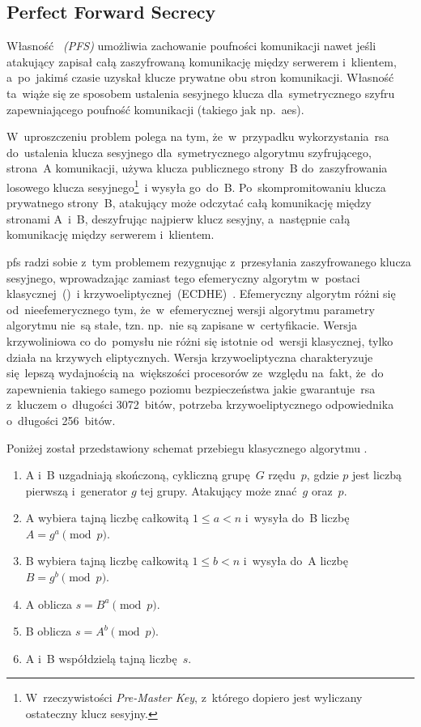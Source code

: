 \documentclass[thesis]{subfiles}
\begin{document}

\subsection{Perfect Forward Secrecy}
\label{sec:pfs}

Własność \emph{~(PFS)} umożliwia zachowanie poufności komunikacji nawet jeśli atakujący zapisał całą zaszyfrowaną komunikację między serwerem i~klientem, a~po~jakimś czasie uzyskał klucze prywatne obu stron komunikacji. Własność ta~wiąże się ze sposobem ustalenia sesyjnego klucza dla~symetrycznego szyfru zapewniającego poufność komunikacji (takiego jak np.~\gls{aes}).

W~uproszczeniu problem polega na tym, że~w~przypadku wykorzystania~\gls{rsa} do~ustalenia klucza sesyjnego dla~symetrycznego algorytmu szyfrującego, strona~A komunikacji, używa klucza publicznego strony~B do~zaszyfrowania losowego klucza sesyjnego\footnote{W~rzeczywistości \emph{Pre-Master Key}, z~którego dopiero jest wyliczany ostateczny klucz sesyjny.}~i wysyła go~do~B. Po~skompromitowaniu klucza prywatnego strony~B, atakujący może odczytać całą komunikację między stronami A~i~B, deszyfrując najpierw klucz sesyjny, a~następnie całą komunikację między serwerem i~klientem.

\gls{pfs} radzi sobie z~tym problemem rezygnując z~przesyłania zaszyfrowanego klucza sesyjnego, wprowadzając zamiast tego efemeryczny algorytm  w~postaci klasycznej~()~i krzywoeliptycznej~(ECDHE)~\cite{mimuw-ssl-w04,openssl-cookbook-suites}. Efemeryczny algorytm  różni się od~nieefemerycznego tym, że~w~efemerycznej wersji algorytmu parametry algorytmu nie~są stałe, tzn. np.~nie są zapisane w~certyfikacie. Wersja krzywoliniowa co do~pomysłu nie różni się istotnie od~wersji klasycznej, tylko działa na krzywych eliptycznych. Wersja krzywoeliptyczna charakteryzuje się~lepszą wydajnością na~większości procesorów ze~względu na~fakt, że~do zapewnienia takiego samego poziomu bezpieczeństwa jakie gwarantuje~\gls{rsa} z~kluczem o~długości 3072~bitów, potrzeba krzywoeliptycznego odpowiednika o~długości 256~bitów.

Poniżej został przedstawiony schemat przebiegu klasycznego algorytmu .

\begin{enumerate}
\item A i~B uzgadniają skończoną, cykliczną grupę~$G$ rzędu~$p$, gdzie $p$ jest liczbą pierwszą i~generator $g$ tej grupy. Atakujący może znać~$g$ oraz~$p$.
\item A wybiera tajną liczbę całkowitą $1 \leq a < n$ i~wysyła do~B liczbę $A=g^a \pmod{p}$.
\item B wybiera tajną liczbę całkowitą $1 \leq b < n$ i~wysyła do~A liczbę $B=g^b \pmod{p}$.
\item A oblicza $s=B^a \pmod{p}$.
\item B oblicza $s=A^b \pmod{p}$.
\item A i~B współdzielą tajną liczbę~$s$.
\end{enumerate}
\end{document}
